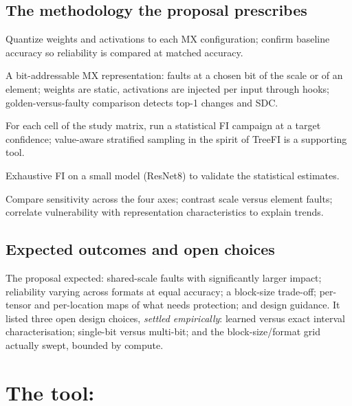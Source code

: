 \subsection{The methodology the proposal prescribes}
\begin{description}[leftmargin=1.2cm,style=nextline]
\item[Quantization] Quantize weights and activations to each MX configuration; confirm baseline accuracy so reliability is compared at matched accuracy.
\item[Injection engine] A bit-addressable MX representation: faults at a chosen bit of the scale or of an element; weights are static, activations are injected per input through hooks; golden-versus-faulty comparison detects top-1 changes and SDC.
\item[Campaign] For each cell of the study matrix, run a statistical FI campaign at a target confidence; value-aware stratified sampling in the spirit of TreeFI is a supporting tool.
\item[Ground truth] Exhaustive FI on a small model (ResNet8) to validate the statistical estimates.
\item[Analysis] Compare sensitivity across the four axes; contrast scale versus element faults; correlate vulnerability with representation characteristics to explain trends.
\end{description}

\subsection{Expected outcomes and open choices}
The proposal expected: shared-scale faults with significantly larger impact; reliability varying across formats at equal accuracy; a block-size trade-off; per-tensor and per-location maps of what needs protection; and design guidance. It listed three open design choices, \emph{settled empirically}: learned versus exact interval characterisation; single-bit versus multi-bit; and the block-size/format grid actually swept, bounded by compute.

\section{The tool: }

